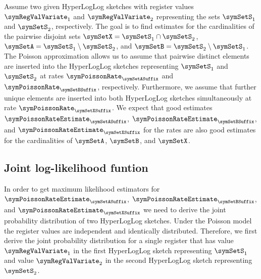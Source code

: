 \documentclass[a4paper]{scrartcl}
\begin{document}
Assume two given  HyperLogLog sketches with register values $\boldsymbol{\symRegValVariate}_1$ and $\boldsymbol{\symRegValVariate}_2$ representing the sets $\symSetS_1$ and $\symSetS_2$, respectively. The goal is to find estimates for the cardinalities of the pairwise disjoint sets $\symSetX = \symSetS_1\cap\symSetS_2$, $\symSetA = \symSetS_1\setminus\symSetS_2$, and $\symSetB = \symSetS_2\setminus\symSetS_1$. The Poisson approximation allows us to assume that pairwise distinct elements are inserted into the HyperLogLog sketches representing $\symSetS_1$ and $\symSetS_2$ at rates $\symPoissonRate_\symSetASuffix$ and $\symPoissonRate_\symSetBSuffix$, respectively. Furthermore, we assume that further unique elements are inserted into both HyperLogLog sketches simultaneously at rate $\symPoissonRate_\symSetXSuffix$. We expect that good estimates $\symPoissonRateEstimate_\symSetASuffix$, $\symPoissonRateEstimate_\symSetBSuffix$, and $\symPoissonRateEstimate_\symSetXSuffix$ for the rates are also good estimates for the cardinalities of $\symSetA$, $\symSetB$, and $\symSetX$. 

\subsection{Joint log-likelihood funtion}
In order to get maximum likelihood estimators for $\symPoissonRateEstimate_\symSetASuffix$, $\symPoissonRateEstimate_\symSetBSuffix$, and $\symPoissonRateEstimate_\symSetXSuffix$ we need to derive the joint probability distribution of two HyperLogLog sketches. Under the Poisson model the register values are independent and identically distributed. Therefore, we first derive the joint probability distribution for a single register that has value $\symRegValVariate_1$ in the first HyperLogLog sketch representing $\symSetS_1$ and value $\symRegValVariate_2$ in the second HyperLogLog sketch representing $\symSetS_2$. 
\end{document}
